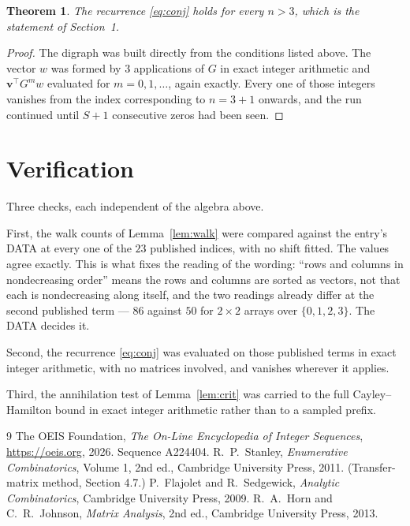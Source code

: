 \documentclass[11pt,a4paper]{article}
\theoremstyle{plain}
\newtheorem{theorem}{Theorem}
\theoremstyle{definition}
\begin{document}
\begin{theorem}
The recurrence \eqref{eq:conj} holds for every $n>3$, which is the statement of
Section~1.
\end{theorem}

\begin{proof}
The digraph was built directly from the conditions listed above. The vector $w$ was formed by
$3$ applications of $G$ in exact integer arithmetic and $\mathbf{v}^{\!\top}G^{m}w$
evaluated for $m=0,1,\dots$, again exactly. Every one of those integers vanishes from the
index corresponding to $n=3+1$ onwards, and the run continued until $S+1$ consecutive
zeros had been seen.
\end{proof}

\section{Verification}

Three checks, each independent of the algebra above.

First, the walk counts of Lemma~\ref{lem:walk} were compared against the entry's DATA at
every one of the $23$ published indices, with no shift fitted. The values agree exactly.
This is what fixes the reading of the wording: ``rows and columns in nondecreasing order''
means the rows and columns are sorted as vectors, not that each is nondecreasing along
itself, and the two readings already differ at the second published term --- $86$ against
$50$ for $2\times2$ arrays over $\{0,1,2,3\}$. The DATA decides it.

Second, the recurrence \eqref{eq:conj} was evaluated on those published terms in exact
integer arithmetic, with no matrices involved, and vanishes wherever it applies.

Third, the annihilation test of Lemma~\ref{lem:crit} was carried to the full
Cayley--Hamilton bound in exact integer arithmetic rather than to a sampled prefix.

\begin{thebibliography}{9}
 The OEIS Foundation, \emph{The On-Line Encyclopedia of Integer
Sequences}, \url{https://oeis.org}, 2026. Sequence A224404.
 R.~P.~Stanley, \emph{Enumerative Combinatorics}, Volume 1, 2nd ed.,
Cambridge University Press, 2011. (Transfer-matrix method, Section 4.7.)
 P.~Flajolet and R.~Sedgewick, \emph{Analytic Combinatorics}, Cambridge
University Press, 2009.
 R.~A.~Horn and C.~R.~Johnson, \emph{Matrix Analysis}, 2nd ed., Cambridge
University Press, 2013.
\end{thebibliography}
\end{document}
